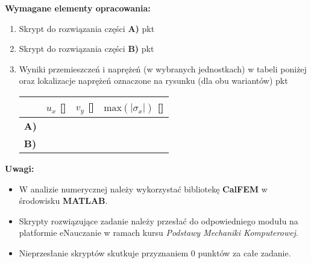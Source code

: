 \documentclass[a4paper,10pt]{article}
\begin{document}
    \noindent\textbf{Wymagane elementy opracowania:}

    \begin{enumerate}
    \item Skrypt do rozwiązania części \textbf{A)}  pkt
    \item Skrypt do rozwiązania części \textbf{B)}  pkt
    \item Wyniki przemieszczeń i naprężeń (w wybranych jednostkach) w tabeli poniżej oraz lokalizacje naprężeń oznaczone na rysunku (dla obu wariantów)  pkt
    \begin{table}[ht]
        \centering
        \begin{tabular}{@{}m{} m{} m{} m{} @{}}
        \toprule
         & $u_x$ [\dotfill] & $v_y$ [\dotfill] & $\mathrm{max}(|\sigma_x|)$ [\dotfill] \\ \midrule
         \textbf{A)} & & & \\ \midrule
         \textbf{B)} & & & \\ \bottomrule
        \end{tabular}
        \label{tab:rezultaty}
    \end{table}
    \end{enumerate}

    \noindent\textbf{Uwagi:}
    \begin{itemize}
    \item W analizie numerycznej należy wykorzystać bibliotekę \textbf{CalFEM} w środowisku \textbf{MATLAB}.
    \item Skrypty rozwiązujące zadanie należy przesłać do odpowiedniego modułu na platformie eNauczanie w ramach kursu \textit{Podstawy Mechaniki Komputerowej}.
    \item Nieprzesłanie skryptów skutkuje przyznaniem 0 punktów za całe zadanie.
    \end{itemize}
\end{document}
